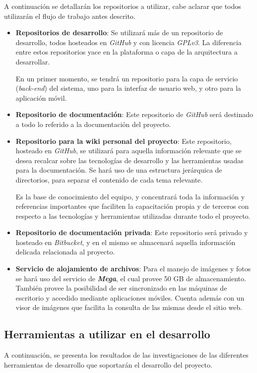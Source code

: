 A continuación se detallarán los repositorios a utilizar, cabe aclarar que todos utilizarán el flujo de trabajo antes descrito.
	\begin{itemize}
	\item \textbf{Repositorios de desarrollo}:
	Se utilizará más de un repositorio de desarrollo, todos hosteados en \textit{GitHub} y con licencia \textit{GPLv3}.
    La diferencia entre estos repositorios yace en la plataforma o capa de la arquitectura a desarrollar.
    
    En un primer momento, se tendrá un repositorio para la capa de servicio (\textit{back-end}) del sistema, uno para la interfaz de usuario web, y otro para la aplicación móvil.

	\item \textbf{Repositorio de documentación}:
    Este repositorio de \textit{GitHub} será destinado a todo lo referido a la documentación del proyecto.

	\item \textbf{Repositorio para la wiki personal del proyecto}:
	Este repositorio, hosteado en \textit{GitHub}, se utilizará para aquella información relevante que se desea recalcar sobre las tecnologías de desarrollo y las herramientas usadas para la documentación.
    Se hará uso de una estructura jerárquica de directorios, para separar el contenido de cada tema relevante.
    
    Es la base de conocimiento del equipo, y concentrará toda la información y referencias importantes que faciliten la capacitación propia y de terceros con respecto a las tecnologías y herramientas utilizadas durante todo el proyecto.

	\item \textbf{Repositorio de documentación privada}:
	Este repositorio será privado y hosteado en \textit{Bitbucket}, y en el mismo se almacenará aquella información delicada relacionada al proyecto.

    \item \textbf{Servicio de alojamiento de archivos}:
    Para el manejo de imágenes y fotos se hará uso del servicio de \textbf{\textit{Mega}}, el cual provee 50 GB de almacenamiento.
    También provee la posibilidad de ser sincronizado en las máquinas de escritorio y accedido mediante aplicaciones móviles.
    Cuenta además con un visor de imágenes que facilita la consulta de las mismas desde el sitio web.
	\end{itemize}


\subsection{Herramientas a utilizar en el desarrollo}
A continuación, se presenta los resultados de las investigaciones de las diferentes herramientas de desarrollo que soportarán el desarrollo del proyecto.

